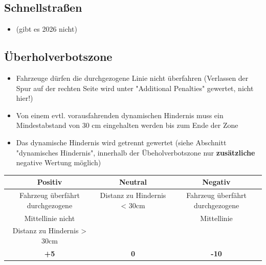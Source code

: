 \documentclass[a4paper, 11pt,usegeometry]{scrartcl}
\begin{document}
\subsection*{Schnellstraßen}
\begin{itemize}
 \item (gibt es 2026 nicht)
\end{itemize}

\subsection*{Überholverbotszone}
\begin{itemize}
 \item Fahrzeuge dürfen die durchgezogene Linie nicht überfahren
(Verlassen der Spur auf der rechten Seite wird unter "Additional Penalties" gewertet, nicht hier!)
 \item Von einem evtl. vorausfahrenden dynamischen Hindernis muss ein Mindestabstand von 30 cm eingehalten werden bis zum Ende der Zone
 \item Das dynamische Hindernis wird getrennt gewertet (siehe Abschnitt "dynamisches Hindernis",
 innerhalb der Übeholverbotszone nur \textbf{zusätzliche} negative Wertung möglich)
\end{itemize}
\begin{table}[H]
\begin{tabular}{|c|c|c|}
\hline
\rowcolor[HTML]{CACACA} 
\textbf{Positiv} & \textbf{Neutral} & \textbf{Negativ} \\ \hline
Fahrzeug überfährt durchgezogene & Distanz zu Hindernis < 30cm & Fahrzeug überfährt durchgezogene \\
Mittellinie nicht &  & Mittellinie \\ \hline
Distanz zu Hindernis > 30cm &  & \\ \hline
\textbf{+5} & \textbf{0} & \textbf{-10} \\ \hline
\end{tabular}
\end{table}
\end{document}
